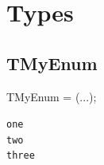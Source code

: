 \documentclass{report}
\begin{document}
\section{Types}
\subsection*{TMyEnum}
\begin{list}{}{
\setlength{\itemindent}{0cm}
\setlength{\listparindent}{0cm}
\setlength{\leftmargin}{\evensidemargin}
\addtolength{\leftmargin}{\tmplength}
\settowidth{\labelsep}{X}
\addtolength{\leftmargin}{\labelsep}
\setlength{\labelwidth}{\tmplength}
}
\begin{flushleft}
\item[\textbf{Declaration}\hfill]
\begin{ttfamily}
TMyEnum = (...);\end{ttfamily}


\end{flushleft}
\par
\item[\textbf{Description}]
 \item[\textbf{Values}]
\begin{description}
\item[\texttt{one}]  
\item[\texttt{two}]  
\item[\texttt{three}]  
\end{description}


\end{list}
\end{document}
